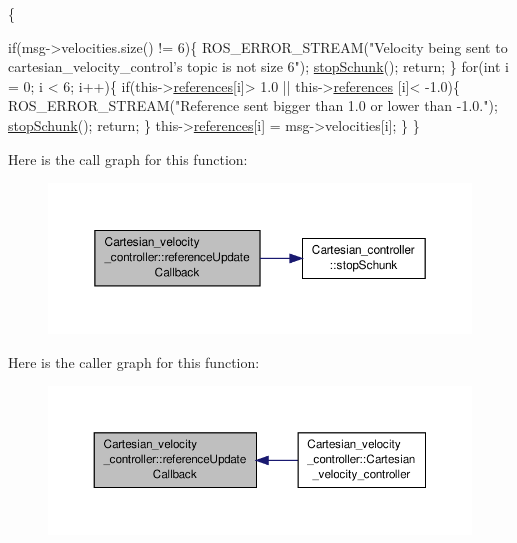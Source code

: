 \begin{DoxyCode}
                                                                               
                          \{

        \textcolor{keywordflow}{if}(msg->velocities.size() != 6)\{
                ROS\_ERROR\_STREAM(\textcolor{stringliteral}{"Velocity being sent to
       cartesian\_velocity\_control's topic is not size 6"});
                \hyperlink{classCartesian__controller_a3ba54e8b35632526c5e8eb2ab5d7de0d}{stopSchunk}();
                \textcolor{keywordflow}{return};
        \}
        \textcolor{keywordflow}{for}(\textcolor{keywordtype}{int} i = 0; i < 6; i++)\{
                \textcolor{keywordflow}{if}(this->\hyperlink{classCartesian__velocity__controller_afc3792f1f6dd0025417d752a89e519e1}{references}[i]> 1.0 || this->\hyperlink{classCartesian__velocity__controller_afc3792f1f6dd0025417d752a89e519e1}{references}
      [i]< -1.0)\{
                        ROS\_ERROR\_STREAM(\textcolor{stringliteral}{"Reference sent bigger than 1.0 or
       lower than -1.0."});
                        \hyperlink{classCartesian__controller_a3ba54e8b35632526c5e8eb2ab5d7de0d}{stopSchunk}();
                        \textcolor{keywordflow}{return};
                \}
                this->\hyperlink{classCartesian__velocity__controller_afc3792f1f6dd0025417d752a89e519e1}{references}[i] = msg->velocities[i];
        \}
\}
\end{DoxyCode}


Here is the call graph for this function\-:\nopagebreak
\begin{figure}[H]
\begin{center}
\leavevmode
\includegraphics[width=350pt]{classCartesian__velocity__controller_a2f020f22b2e63da5afeff3f083e4095c_cgraph}
\end{center}
\end{figure}




Here is the caller graph for this function\-:\nopagebreak
\begin{figure}[H]
\begin{center}
\leavevmode
\includegraphics[width=350pt]{classCartesian__velocity__controller_a2f020f22b2e63da5afeff3f083e4095c_icgraph}
\end{center}
\end{figure}


